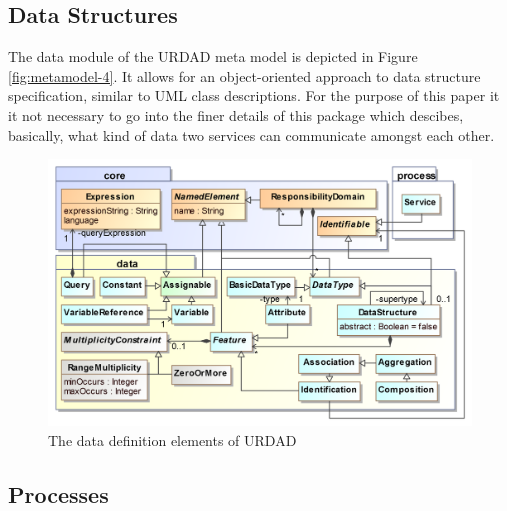 \subsection{Data Structures}

The data module of the URDAD meta model is depicted in Figure \ref{fig:metamodel-4}. It allows for an object-oriented approach to data structure specification, similar to UML class descriptions. For the purpose of this paper it it not necessary to go into the finer details of this package which descibes, basically, what kind of data two services can communicate amongst each other.
\begin{figure}[Htbp]
  \centering
  \includegraphics{data}
  \caption{The data definition elements of URDAD}
  \label{fig:dataStructureModule}
\end{figure}


\subsection{Processes}


